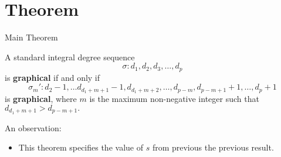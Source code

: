 \section{Theorem}

\begin{frame}{Main Theorem}
	\begin{theorem}
		A standard integral degree sequence 
		\begin{equation}
			\sigma: d_1,d_2,d_3,\ldots, d_p
		\end{equation}
		is \textbf{graphical} if and only if
		\begin{equation*}
			\sigma_m':d_2-1,\ldots d_{d_1+m+1}-1,d_{d_1+m+2},\ldots, d_{p-m},d_{p-m+1}+1,\ldots,d_p+1
		\end{equation*}
		is \textbf{graphical}, where $m$ is the maximum non-negative integer such that $d_{d_1+m+1}>d_{p-m+1}.$
	\end{theorem}
		An observation:
	\begin{itemize}
		\item This theorem specifies the value of $s$ from previous the previous result.
	\end{itemize}
\end{frame}
